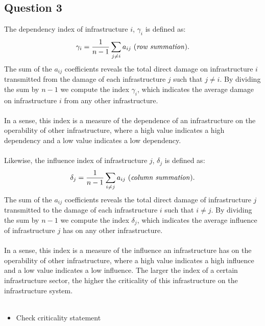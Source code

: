 \documentclass[11pt,a4paper]{article}
\begin{document}
\subsection*{Question 3}
The dependency index of infrastructure $i$, $\gamma_i$ is defined as:
\begin{align}
	\gamma_i = \frac{1}{n-1}\sum_{j \neq i} a_{ij} \text{ (\textit{row summation})}.
\end{align}
The sum of the $a_{ij}$ coefficients reveals the total direct damage on infrastructure $i$ transmitted from the damage of each infrastructure $j$ such that $j \neq i$. By dividing the sum by $n-1$ we compute the index $\gamma_i$, which indicates the average damage on infrastructure $i$ from any other infrastructure.\\
\\
In a sense, this index is a measure of the dependence of an infrastructure on the operability of other infrastructure, where a high value indicates a high dependency and a low value indicates a low dependency.\\
\\
Likewise, the influence index of infrastructure $j$, $\delta_j$ is defined as:
\begin{align}
	\delta_j = \frac{1}{n-1}\sum_{i \neq j} a_{ij} \text{ (\textit{column summation})}.
\end{align}
The sum of the $a_{ij}$ coefficients reveals the total direct damage of infrastructure $j$ transmitted to the damage of each infrastructure $i$ such that $i \neq j$. By dividing the sum by $n-1$ we compute the index $\delta_j$, which indicates the average influence of infrastructure $j$ has on any other infrastructure. \\
\\
In a sense, this index is a measure of the influence an infrastructure has on the operability of other infrastructure, where a high value indicates a high influence and a low value indicates a low influence. The larger the index of a certain infrastructure sector, the higher the criticality of this infrastructure on the infrastructure system. \\
\\
\begin{itemize}
	\item Check criticality statement
\end{itemize}
\end{document}
